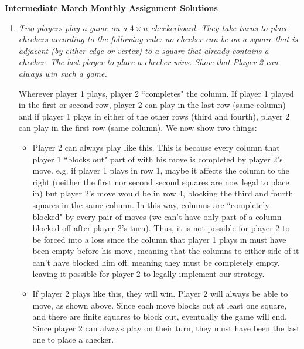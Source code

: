 \documentclass{article}
\begin{document}
\thispagestyle{empty}

\begin{center}
  \textbf{\Large Intermediate March Monthly Assignment Solutions}
\end{center}

\vspace{12pt}

\begin{enumerate}[1.]

\vspace{24pt}
\item %
{\itshape Two players play a game on a ${4\times n}$ checkerboard. They take turns to place checkers according to the following rule: no checker can be on a square that is adjacent (by either edge or vertex) to a square that already contains a checker. The last player to place a checker wins. Show that Player 2 can always win such a game.}

Wherever player 1 plays, player 2 ``completes" the column. If player 1 played in the first or second row, player 2 can play in the last row (same column) and if player 1 plays in either of the other rows (third and fourth), player 2 can play in the first row (same column). We now show two things:
\begin{itemize}
\item Player 2 can always play like this. This is because every column that player 1 ``blocks out" part of with his move is completed by player 2's move. e.g. if player 1 plays in row 1, maybe it affects the column to the right (neither the first nor second second squares are now legal to place in) but player 2's move would be in row 4, blocking the third and fourth squares in the same column. In this way, columns are ``completely blocked" by every pair of moves (we can't have only part of a column blocked off after player 2's turn). Thus, it is not possible for player 2 to be forced into a loss since the column that player 1 plays in must have been empty before his move, meaning that the columns to either side of it can't have blocked him off, meaning they must be completely empty, leaving it possible for player 2 to legally implement our strategy.
\item If player 2 plays like this, they will win. Player 2 will always be able to move, as shown above. Since each move blocks out at least one square, and there are finite squares to block out, eventually the game will end. Since player 2 can always play on their turn, they must have been the last one to place a checker.
\end{itemize}


\end{enumerate}
\end{document}
